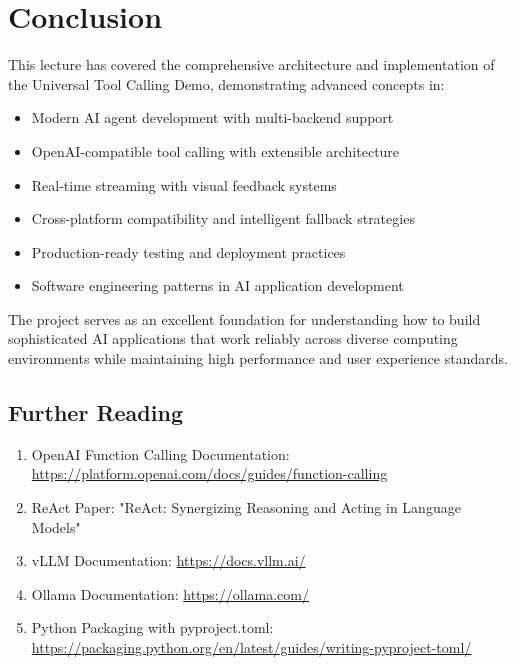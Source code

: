 \documentclass{article}
\begin{document}
\section{Conclusion}

This lecture has covered the comprehensive architecture and implementation of the Universal Tool Calling Demo, demonstrating advanced concepts in:

\begin{itemize}
    \item Modern AI agent development with multi-backend support
    \item OpenAI-compatible tool calling with extensible architecture
    \item Real-time streaming with visual feedback systems
    \item Cross-platform compatibility and intelligent fallback strategies
    \item Production-ready testing and deployment practices
    \item Software engineering patterns in AI application development
\end{itemize}

The project serves as an excellent foundation for understanding how to build sophisticated AI applications that work reliably across diverse computing environments while maintaining high performance and user experience standards.

\subsection{Further Reading}

\begin{enumerate}
    \item OpenAI Function Calling Documentation: \url{https://platform.openai.com/docs/guides/function-calling}
    \item ReAct Paper: "ReAct: Synergizing Reasoning and Acting in Language Models"
    \item vLLM Documentation: \url{https://docs.vllm.ai/}
    \item Ollama Documentation: \url{https://ollama.com/}
    \item Python Packaging with pyproject.toml: \url{https://packaging.python.org/en/latest/guides/writing-pyproject-toml/}
\end{enumerate}
\end{document}
